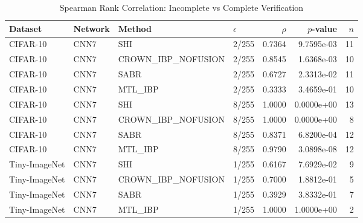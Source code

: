 \begin{table}[htbp]
\centering
\caption{Spearman Rank Correlation: Incomplete vs Complete Verification}
\label{tab:verification_correlation}
\begin{tabular}{llll|rrr}
\toprule
Dataset & Network & Method & $\epsilon$ & $\rho$ & $p$-value & $n$ \\
\midrule
CIFAR-10 & CNN7 & SHI & 2/255 & 0.7364 & 9.7595e-03 & 11 \\
CIFAR-10 & CNN7 & CROWN_IBP_NOFUSION & 2/255 & 0.8545 & 1.6368e-03 & 10 \\
CIFAR-10 & CNN7 & SABR & 2/255 & 0.6727 & 2.3313e-02 & 11 \\
CIFAR-10 & CNN7 & MTL_IBP & 2/255 & 0.3333 & 3.4659e-01 & 10 \\
CIFAR-10 & CNN7 & SHI & 8/255 & 1.0000 & 0.0000e+00 & 13 \\
CIFAR-10 & CNN7 & CROWN_IBP_NOFUSION & 8/255 & 1.0000 & 0.0000e+00 & 8 \\
CIFAR-10 & CNN7 & SABR & 8/255 & 0.8371 & 6.8200e-04 & 12 \\
CIFAR-10 & CNN7 & MTL_IBP & 8/255 & 0.9790 & 3.0898e-08 & 12 \\
Tiny-ImageNet & CNN7 & SHI & 1/255 & 0.6167 & 7.6929e-02 & 9 \\
Tiny-ImageNet & CNN7 & CROWN_IBP_NOFUSION & 1/255 & 0.7000 & 1.8812e-01 & 5 \\
Tiny-ImageNet & CNN7 & SABR & 1/255 & 0.3929 & 3.8332e-01 & 7 \\
Tiny-ImageNet & CNN7 & MTL_IBP & 1/255 & 1.0000 & 1.0000e+00 & 2 \\
\bottomrule
\end{tabular}
\end{table}
